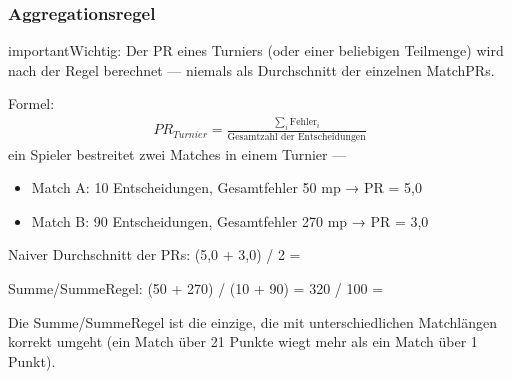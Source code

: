 \documentclass[letterpaper,10pt,german]{sphinxmanual}
\begin{document}
\subsubsection{Aggregationsregel}
\label{\detokenize{manuel:regle-d-agregation}}
\begin{sphinxadmonition}{important}{Wichtig:}
\sphinxAtStartPar
Der PR eines Turniers (oder einer beliebigen Teilmenge) wird nach der \sphinxhyphen{}Regel berechnet — niemals als Durchschnitt der einzelnen Match\sphinxhyphen{}PRs.

\sphinxAtStartPar
Formel:
\begin{equation*}
\begin{split}PR_{Turnier} = \frac{\sum_{i} \text{Fehler}_i}{\text{Gesamtzahl der Entscheidungen}}\end{split}
\end{equation*}
\sphinxAtStartPar
{} ein Spieler bestreitet zwei Matches in einem Turnier —
\begin{itemize}
\item {} 
\sphinxAtStartPar
Match A: 10 Entscheidungen, Gesamtfehler 50 mp → PR = 5,0

\item {} 
\sphinxAtStartPar
Match B: 90 Entscheidungen, Gesamtfehler 270 mp → PR = 3,0

\end{itemize}

\sphinxAtStartPar
Naiver Durchschnitt der PRs: (5,0 + 3,0) / 2 =  

\sphinxAtStartPar
Summe/Summe\sphinxhyphen{}Regel: (50 + 270) / (10 + 90) = 320 / 100 =  

\sphinxAtStartPar
Die Summe/Summe\sphinxhyphen{}Regel ist die einzige, die mit unterschiedlichen Matchlängen korrekt umgeht (ein Match über 21 Punkte wiegt mehr als ein Match über 1 Punkt).
\end{sphinxadmonition}
\end{document}
